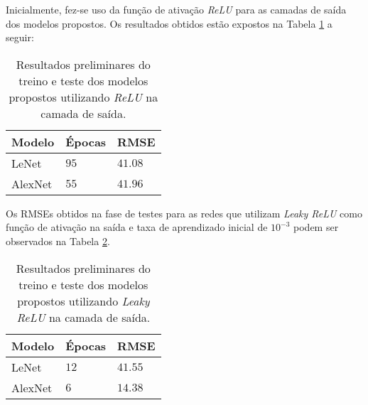 
Inicialmente, fez-se uso da função de ativação \emph{ReLU} para as camadas de saída dos modelos propostos. Os resultados obtidos estão expostos na Tabela \ref{tab:results_relu} a seguir:
\begin{table}
     \caption{Resultados preliminares do treino e teste dos modelos propostos utilizando \emph{ReLU} na camada de saída.}
     \label{tab:results_relu}
     \centering
     \begin{tabular}{l l l}
          \toprule
          Modelo & Épocas &RMSE \\
          \midrule
          LeNet & $95$ & $41.08$ \\
          AlexNet & $55$ & $41.96$\\
          \bottomrule
     \end{tabular}
\end{table}

Os RMSEs obtidos na fase de testes para as redes que utilizam \emph{Leaky ReLU} como função de ativação na saída e taxa de aprendizado inicial de $10^{-3}$ podem ser observados na Tabela \ref{tab:results_leaky}.

\begin{table}[h!]
     \caption{Resultados preliminares do treino e teste dos modelos propostos utilizando \emph{Leaky ReLU} na camada de saída.}
     \label{tab:results_leaky}
     \centering
     \begin{tabular}{l l l}
          \toprule
          Modelo & Épocas & RMSE \\
          \midrule
          LeNet & $12$ & $41.55$ \\
          AlexNet & $6$ & $14.38$\\
          \bottomrule
     \end{tabular}
\end{table}
